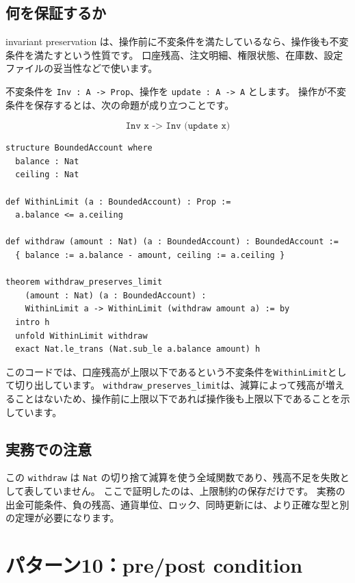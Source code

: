 \subsection{何を保証するか}

invariant preservation は、操作前に不変条件を満たしているなら、操作後も不変条件を満たすという性質です。
口座残高、注文明細、権限状態、在庫数、設定ファイルの妥当性などで使います。

不変条件を \texttt{Inv : A -> Prop}、操作を \texttt{update : A -> A} とします。
操作が不変条件を保存するとは、次の命題が成り立つことです。

\[
\texttt{Inv x -> Inv (update x)}
\]

\begin{listing}[htbp]
\begin{verbatim}
structure BoundedAccount where
  balance : Nat
  ceiling : Nat

def WithinLimit (a : BoundedAccount) : Prop :=
  a.balance <= a.ceiling

def withdraw (amount : Nat) (a : BoundedAccount) : BoundedAccount :=
  { balance := a.balance - amount, ceiling := a.ceiling }

theorem withdraw_preserves_limit
    (amount : Nat) (a : BoundedAccount) :
    WithinLimit a -> WithinLimit (withdraw amount a) := by
  intro h
  unfold WithinLimit withdraw
  exact Nat.le_trans (Nat.sub_le a.balance amount) h
\end{verbatim}
\caption{\texttt{withdraw\_preserves\_limit}}
\label{lst:appc_invariant_preservation}
\end{listing}

このコードでは、口座残高が上限以下であるという不変条件を\texttt{WithinLimit}として切り出しています。
\texttt{withdraw\_preserves\_limit}は、減算によって残高が増えることはないため、操作前に上限以下であれば操作後も上限以下であることを示しています。

\subsection{実務での注意}

この \texttt{withdraw} は \texttt{Nat} の切り捨て減算を使う全域関数であり、残高不足を失敗として表していません。
ここで証明したのは、上限制約の保存だけです。
実務の出金可能条件、負の残高、通貨単位、ロック、同時更新には、より正確な型と別の定理が必要になります。

\section{パターン10：pre/post condition}

